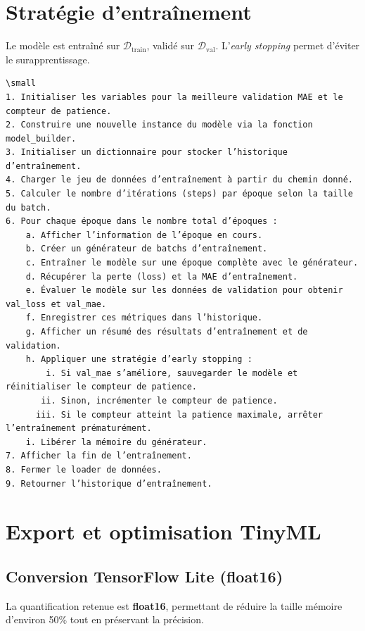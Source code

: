 \section{Stratégie d’entraînement}
\label{sec:entrainement}

Le modèle est entraîné sur \(\mathcal{D}_{\text{train}}\), validé sur \(\mathcal{D}_{\text{val}}\).
L’\textit{early stopping} permet d’éviter le surapprentissage.

\begin{verbatim}
\small
1. Initialiser les variables pour la meilleure validation MAE et le compteur de patience.
2. Construire une nouvelle instance du modèle via la fonction model_builder.
3. Initialiser un dictionnaire pour stocker l’historique d’entraînement.
4. Charger le jeu de données d’entraînement à partir du chemin donné.
5. Calculer le nombre d’itérations (steps) par époque selon la taille du batch.
6. Pour chaque époque dans le nombre total d’époques :
    a. Afficher l’information de l’époque en cours.
    b. Créer un générateur de batchs d’entraînement.
    c. Entraîner le modèle sur une époque complète avec le générateur.
    d. Récupérer la perte (loss) et la MAE d’entraînement.
    e. Évaluer le modèle sur les données de validation pour obtenir val_loss et val_mae.
    f. Enregistrer ces métriques dans l’historique.
    g. Afficher un résumé des résultats d’entraînement et de validation.
    h. Appliquer une stratégie d’early stopping :
        i. Si val_mae s’améliore, sauvegarder le modèle et réinitialiser le compteur de patience.
       ii. Sinon, incrémenter le compteur de patience.
      iii. Si le compteur atteint la patience maximale, arrêter l’entraînement prématurément.
    i. Libérer la mémoire du générateur.
7. Afficher la fin de l’entraînement.
8. Fermer le loader de données.
9. Retourner l’historique d’entraînement.
\end{verbatim}

\section{Export et optimisation TinyML}
\label{sec:optim_tinyml}

\subsection{Conversion TensorFlow Lite (float16)}
La quantification retenue est \textbf{float16}, permettant de réduire la taille mémoire d’environ 50\% tout en préservant la précision.

